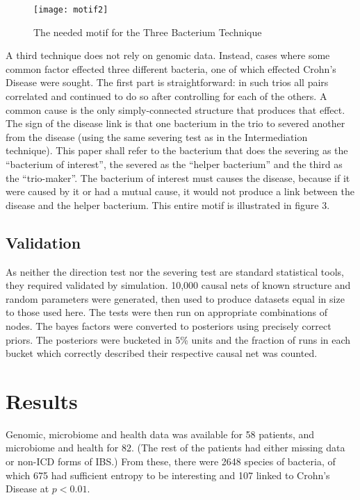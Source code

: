 \documentclass[a4paper]{article}
\begin{document}
\begin{figure}
  \texttt{[image: motif2]}
  \caption{The needed motif for the Three Bacterium Technique}
\end{figure}

A third technique does not rely on genomic data.  Instead, cases where
some common factor effected three different
bacteria, one of which effected Crohn's Disease were sought.  The first part is
straightforward: in such trios all pairs correlated
and continued to do so after controlling for each of the others.  A
common cause is the only simply-connected structure that produces that
effect.  The sign of the disease link is that  one bacterium in the
trio to severed
another from the disease (using the same severing test as in the
Intermediation technique).  This paper shall refer to the bacterium that does the
severing as the ``bacterium of interest'', the severed as the ``helper
bacterium'' and the third as the ``trio-maker''.  The
bacterium of interest must causes the disease, because if it were caused by
it or had a mutual cause, it would not produce a link between the
disease and the helper bacterium.  This entire motif is illustrated
in figure 3.

\subsection{Validation}

As neither the direction test nor the severing test are standard
statistical tools, they required validated by simulation.  
10,000 causal nets of known structure and random parameters were
generated, then used to produce
datasets equal in size to those used here. The tests were then run on
appropriate combinations of nodes.  The bayes factors were converted to
posteriors using precisely correct priors.  The posteriors were bucketed in 5\%
units and the fraction of runs in each bucket which correctly
described their respective causal net was counted.

\section{Results}

Genomic, microbiome and health data was available for 58 patients, and
microbiome and health for 82.  (The rest of the patients had either
missing data or non-ICD forms of IBS.)  From
these, there were 2648 species of bacteria, of which 675 had sufficient
entropy to be interesting and 107 linked to Crohn's Disease at
$p<0.01$.
\end{document}
